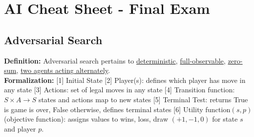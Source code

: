 \section{AI Cheat Sheet - Final Exam}
\subsection{Adversarial Search}
\textbf{Definition:} Adversarial search pertains to \underline{deterministic}, \underline{full-observable}, \underline{zero-sum}, \underline{two agents acting alternately}.\\
\textbf{Formalization:} [1] Initial State [2] Player(s): defines which player has move in any state [3] Actions: set of legal moves in any state [4] Transition function: $S \times A \rightarrow S$ states and actions map to new states [5] Terminal Test: returns True is game is over, False otherwise, defines terminal states [6] Utility function$(s,p)$ (objective function): assigns values to wins, loss, draw $(+1, -1, 0)$ for state $s$ and player $p$. 

